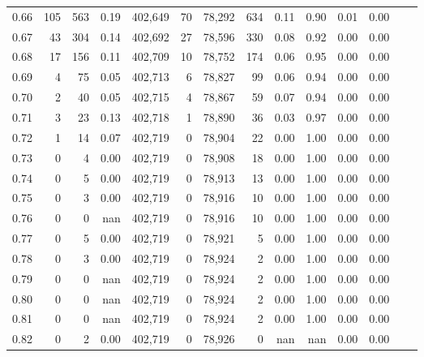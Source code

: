 \begin{tabular}{rrrrrrrrrrrrrr}
0.66 &     105 &    563 &     0.19 &  402,649 &       70 &  78,292 &     634 &  0.11 &  0.90 &  0.01 &      0.00 \\
0.67 &      43 &    304 &     0.14 &  402,692 &       27 &  78,596 &     330 &  0.08 &  0.92 &  0.00 &      0.00 \\
0.68 &      17 &    156 &     0.11 &  402,709 &       10 &  78,752 &     174 &  0.06 &  0.95 &  0.00 &      0.00 \\
0.69 &       4 &     75 &     0.05 &  402,713 &        6 &  78,827 &      99 &  0.06 &  0.94 &  0.00 &      0.00 \\
0.70 &       2 &     40 &     0.05 &  402,715 &        4 &  78,867 &      59 &  0.07 &  0.94 &  0.00 &      0.00 \\
0.71 &       3 &     23 &     0.13 &  402,718 &        1 &  78,890 &      36 &  0.03 &  0.97 &  0.00 &      0.00 \\
0.72 &       1 &     14 &     0.07 &  402,719 &        0 &  78,904 &      22 &  0.00 &  1.00 &  0.00 &      0.00 \\
0.73 &       0 &      4 &     0.00 &  402,719 &        0 &  78,908 &      18 &  0.00 &  1.00 &  0.00 &      0.00 \\
0.74 &       0 &      5 &     0.00 &  402,719 &        0 &  78,913 &      13 &  0.00 &  1.00 &  0.00 &      0.00 \\
0.75 &       0 &      3 &     0.00 &  402,719 &        0 &  78,916 &      10 &  0.00 &  1.00 &  0.00 &      0.00 \\
0.76 &       0 &      0 &      nan &  402,719 &        0 &  78,916 &      10 &  0.00 &  1.00 &  0.00 &      0.00 \\
0.77 &       0 &      5 &     0.00 &  402,719 &        0 &  78,921 &       5 &  0.00 &  1.00 &  0.00 &      0.00 \\
0.78 &       0 &      3 &     0.00 &  402,719 &        0 &  78,924 &       2 &  0.00 &  1.00 &  0.00 &      0.00 \\
0.79 &       0 &      0 &      nan &  402,719 &        0 &  78,924 &       2 &  0.00 &  1.00 &  0.00 &      0.00 \\
0.80 &       0 &      0 &      nan &  402,719 &        0 &  78,924 &       2 &  0.00 &  1.00 &  0.00 &      0.00 \\
0.81 &       0 &      0 &      nan &  402,719 &        0 &  78,924 &       2 &  0.00 &  1.00 &  0.00 &      0.00 \\
0.82 &       0 &      2 &     0.00 &  402,719 &        0 &  78,926 &       0 &   nan &   nan &  0.00 &      0.00 \\

\end{tabular}
